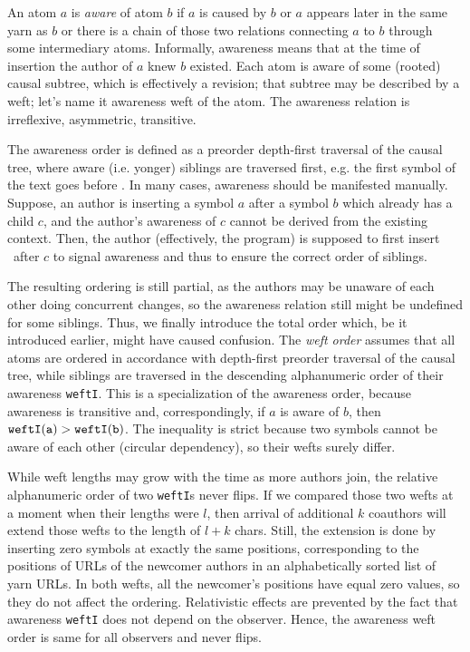 \documentclass{sig-alternate}
\begin{document}
An atom $a$ is \emph{aware} of atom $b$ if $a$ is caused by $b$ or $a$ appears later in the same yarn as $b$ or there is a chain of those two relations connecting $a$ to $b$ through some intermediary atoms.
Informally, awareness means that at the time of insertion the author of $a$ knew $b$ existed. 
Each atom is aware of some (rooted) causal subtree, which is effectively a revision; that subtree may be described by a weft; let's name it awareness weft of the atom.
The awareness relation is irreflexive, asymmetric, transitive.

The awareness order is  defined as a preorder depth-first traversal of the causal tree, where aware (i.e. yonger) siblings are traversed first, e.g. the first symbol of the text goes before \eoa.
In many cases, awareness should be manifested manually.
Suppose, an author is inserting a symbol $a$ after a symbol $b$ which already has a child $c$, and the author's awareness of $c$ cannot be derived from the existing context.
Then, the author (effectively, the program) is supposed to first insert \zero ~after $c$ to signal awareness and thus to ensure the correct order of siblings.

The resulting ordering is still partial, as the authors may be unaware of each other doing concurrent changes, so the awareness relation still might be undefined for some siblings.
Thus, we finally introduce the total order which, be it introduced earlier, might have caused confusion.
The \emph{weft order} assumes that all atoms are ordered in accordance with depth-first preorder traversal of the causal tree, while siblings are traversed in the descending  alphanumeric order of their awareness {\tt weftI}.
This is a specialization of the awareness order, because awareness is transitive and, correspondingly, if $a$ is aware of $b$, then $\tt weftI(a) > weftI(b)$.
The inequality is strict because two symbols cannot be aware of each other (circular dependency), so their wefts surely differ.

While weft lengths may grow with the time as more authors join, the relative alphanumeric order of two {\tt weftI}s never flips.
If we compared those two wefts at a moment when their lengths were $l$, then arrival of additional $k$ coauthors will extend those wefts to the length of $l+k$ chars.
Still, the extension is done by inserting zero symbols at exactly the same positions, corresponding to the positions of URLs of the newcomer authors in an alphabetically sorted list of yarn URLs.
In both wefts, all the newcomer's positions have equal zero values, so they do not affect the ordering.
Relativistic effects are prevented by the fact that awareness {\tt weftI} does not depend on the observer.
Hence, the awareness weft order is same for all observers and never flips.
\end{document}
